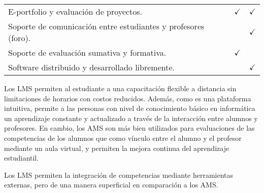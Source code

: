 \begin{table}[H]
{\begin{tabular}{lllcc}
		\multicolumn{3}{l}{E-portfolio y evaluación de proyectos.}                                              & $\checkmark$         & $\checkmark$         \\
		\multicolumn{3}{l}{Soporte de comunicación entre estudiantes y profesores (foro).}                      &           & $\checkmark$         \\
		\multicolumn{3}{l}{Soporte de evaluación sumativa y formativa.}                                         & $\checkmark$         &           \\
		\multicolumn{3}{l}{Software distribuido y desarrollado libremente.}                                     &           & $\checkmark$         \\
		\bottomrule
	\end{tabular}
	}
\end{table}

Los LMS permiten al estudiante a una capacitación flexible a distancia sin limitaciones de horarios con costos reducidos\citep{de2016design}. Además, como es una plataforma intuitiva, permite a las personas con nivel de conocimiento básico en informática un aprendizaje constante y actualizado a través de la interacción entre alumnos y profesores. En cambio, los AMS son más bien utilizados para evaluaciones de las competencias de los alumnos que como vínculo entre el alumno y el profesor mediante un aula virtual, y permiten la mejora continua del aprendizaje estudiantil.

Los LMS permiten la integración de competencias mediante herramientas externas, pero de una manera superficial en comparación a los AMS.